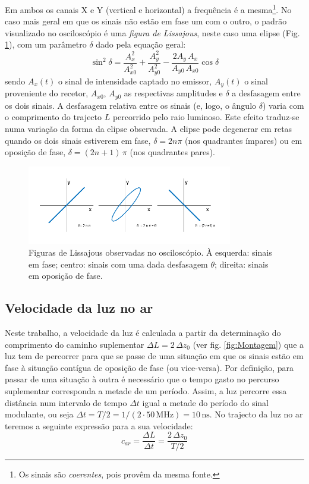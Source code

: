 \documentclass[a4paper,12pt]{article}      %
\begin{document}
Em ambos os canais X e Y (vertical e horizontal) a frequência é a mesma\footnote{Os sinais são \emph{coerentes}, pois provêm da mesma fonte.}. No caso mais geral em que os sinais não estão em fase um com o outro, o padrão visualizado no osciloscópio é uma \emph{figura de Lissajous}, neste caso uma elipse (Fig. \ref{fig:fase}), com um parâmetro $\delta$ dado pela equação geral:
\begin{equation}
	\label{eq:elipse}
	\sin^2 \delta = \frac{A_x^2}{A_{x0}^2} + \frac{A_y^2}{A_{y0}^2} - \frac{2 A_y\,A_x}{A_{y0}\,A_{x0}} \cos  \delta
\end{equation}
sendo $A_x(t)$ o sinal de intensidade captado no emissor,  $A_y(t)$ o sinal
proveniente do recetor, $A_{x0}$, $A_{y0}$ as respectivas amplitudes e $\delta$ a desfasagem entre os dois sinais. A desfasagem relativa entre os sinais (e, logo, o ângulo $\delta$) varia com o comprimento do trajecto $L$ percorrido pelo raio luminoso. Este efeito traduz-se numa variação da forma da elipse observada.  A elipse pode degenerar em retas quando os dois sinais estiverem em fase, $\delta = 2n\pi$ (nos quadrantes ímpares)  ou em oposição de fase, $\delta = (2n+1)\,\pi$ (nos quadrantes pares). 

\begin{figure}
	[htb]  \centering 
	\includegraphics[width=0.8\textwidth]{osci_fase}
	\caption{Figuras de Lissajous observadas no osciloscópio. À esquerda: sinais em fase; centro: sinais com uma dada desfasagem $\theta$; direita: sinais em oposição de fase.  \label{fig:fase}} 
\end{figure}

\subsection{\sf Velocidade da luz no ar}
Neste trabalho, a velocidade da luz é calculada a partir da determinação do comprimento do
caminho suplementar $\Delta L= 2\,\Delta z_0$ (ver fig. \ref{fig:Montagem}) que a luz tem de percorrer para que se passe de uma
situação em que os sinais estão em fase à situação contígua de
 oposição de fase (ou vice-versa). Por definição, para passar de uma situação à outra é necessário que o tempo gasto no percurso suplementar corresponda a metade de um período. Assim, a luz percorre essa distância num intervalo de tempo $\Delta t$ igual a metade do período do sinal modulante, ou seja $\Delta t=T/2=1/(2\cdot50\,\textrm{MHz})= 10\,\textrm{ns}$. 
No trajecto da luz no ar teremos a seguinte expressão para a sua velocidade:
\begin{equation}
	\label{eq:vc}
	c_{ar} = \frac{\Delta L}{\Delta t}=\frac{2\,\Delta z_0}{T/2} 
\end{equation}
\end{document}

